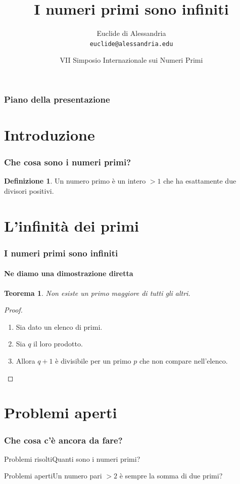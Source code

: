 \documentclass{beamer}
\title{I numeri primi sono infiniti}
\author[Euclide]{Euclide di Alessandria \\
    \texttt{euclide@alessandria.edu}}
\date[VII SINP]{VII Simposio Internazionale sui Numeri Primi}
\institute[UniAlessandria]{Università di Alessandria}
\theoremstyle{definition}
\newtheorem{definizione}{Definizione}
\theoremstyle{plain}
\newtheorem{teorema}{Teorema}
\begin{document}
\begin{frame}
    \maketitle
\end{frame}
\begin{frame}
    \frametitle{Piano della presentazione}
    \tableofcontents
\end{frame}
\section{Introduzione}
\begin{frame}
    \frametitle{Che cosa sono i numeri primi?}
    \begin{definizione}Un 
    \alert{numero primo} è un intero $>1$ che ha esattamente due divisori positivi.
\end{definizione}
\end{frame}
\section{L'infinità dei primi}
\begin{frame}
    \frametitle{I numeri primi sono infiniti}
    \framesubtitle{Ne diamo una dimostrazione diretta}
    \begin{teorema}Non esiste un primo maggiore di tutti gli altri.
\end{teorema}
    \pause
    \begin{proof}
    \begin{enumerate}[<+->]
    \item Sia dato un elenco di primi.
    \item Sia $q$ il loro prodotto.
    \item Allora $q+1$ è divisibile per un primo $p$ che non compare nell'elenco. 
    \qedhere
\end{enumerate}
\end{proof}
\end{frame}
\section{Problemi aperti}
\begin{frame}
    \frametitle{Che cosa c'è ancora da fare?}
    \begin{block}{Problemi risolti}Quanti sono i numeri primi?
\end{block}
    \begin{block}{Problemi aperti}Un numero pari $>2$ è sempre la somma di due primi?
\end{block}
\end{frame}
\end{document}
